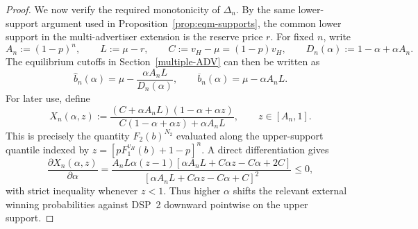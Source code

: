 \begin{proof}
\noindent We now verify the required monotonicity of $\Delta_n$. By the same lower-support argument used in Proposition~\ref{prop:eqm-supports}, the common lower support in the multi-advertiser extension is the reserve price $r$. For fixed $n$, write
\begin{equation*}
    A_n := (1-p)^n, \qquad L := \mu-r, \qquad C := v_H-\mu = (1-p)v_H, \qquad D_n(\alpha) := 1-\alpha+\alpha A_n.
\end{equation*}
The equilibrium cutoffs in Section~\ref{multiple-ADV} can then be written as
\begin{equation*}
    \hat{b}_n(\alpha) = \mu - \frac{\alpha A_n L}{D_n(\alpha)}, \qquad \overline{b}_n(\alpha) = \mu - \alpha A_n L.
\end{equation*}
For later use, define
\begin{equation*}
    X_n(\alpha,z) := \frac{(C+\alpha A_n L)(1-\alpha+\alpha z)}{C(1-\alpha+\alpha z)+\alpha A_n L}, \qquad z \in [A_n,1].
\end{equation*}
This is precisely the quantity $F_2(b)^{N_2}$ evaluated along the upper-support quantile indexed by $z = [pF_1^{v_H}(b)+1-p]^n$. A direct differentiation gives
\begin{equation}\label{eq:Xn-alpha}
    \frac{\partial X_n(\alpha,z)}{\partial \alpha}
    =
    \frac{A_nL\alpha(z-1)\left[\alpha A_nL + C\alpha z - C\alpha + 2C\right]}{\left[\alpha A_nL + C\alpha z - C\alpha + C\right]^2}
    \leq 0,
\end{equation}
with strict inequality whenever $z<1$. Thus higher $\alpha$ shifts the relevant external winning probabilities against DSP~2 downward pointwise on the upper support.


\end{proof}
